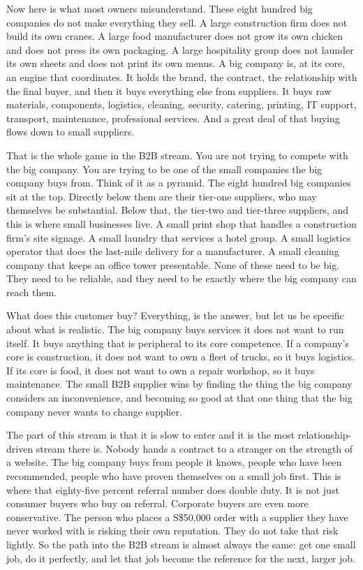 \documentclass[10pt,twoside,openany]{memoir}
\begin{document}
{{{{{{{{{{{{{{Now here is what most owners misunderstand. These eight hundred big
companies do not make everything they sell. A large construction firm
does not build its own cranes. A large food manufacturer does not grow
its own chicken and does not press its own packaging. A large
hospitality group does not launder its own sheets and does not print its
own menus. A big company is, at its core, an engine that coordinates. It
holds the brand, the contract, the relationship with the final buyer,
and then it buys everything else from suppliers. It buys raw materials,
components, logistics, cleaning, security, catering, printing, IT
support, transport, maintenance, professional services. And a great deal
of that buying flows down to small suppliers.

That is the whole game in the B2B stream. You are not trying to compete
with the big company. You are trying to be one of the small companies
the big company buys from. Think of it as a pyramid. The eight hundred
big companies sit at the top. Directly below them are their tier-one
suppliers, who may themselves be substantial. Below that, the tier-two
and tier-three suppliers, and this is where small businesses live. A
small print shop that handles a construction firm's site signage. A
small laundry that services a hotel group. A small logistics operator
that does the last-mile delivery for a manufacturer. A small cleaning
company that keeps an office tower presentable. None of these need to be
big. They need to be reliable, and they need to be exactly where the big
company can reach them.

What does this customer buy? Everything, is the answer, but let us be
specific about what is realistic. The big company buys services it does
not want to run itself. It buys anything that is peripheral to its core
competence. If a company's core is construction, it does not want to own
a fleet of trucks, so it buys logistics. If its core is food, it does
not want to own a repair workshop, so it buys maintenance. The small B2B
supplier wins by finding the thing the big company considers an
inconvenience, and becoming so good at that one thing that the big
company never wants to change supplier.

The part of this stream is that it is slow to enter and it is the most
relationship-driven stream there is. Nobody hands a contract to a
stranger on the strength of a website. The big company buys from people
it knows, people who have been recommended, people who have proven
themselves on a small job first. This is where that eighty-five percent
referral number does double duty. It is not just consumer buyers who buy
on referral. Corporate buyers are even more conservative. The person who
places a S\$50,000 order with a supplier they have never worked with is
risking their own reputation. They do not take that risk lightly. So the
path into the B2B stream is almost always the same: get one small job,
do it perfectly, and let that job become the reference for the next,
larger job.

}}}}}}}}}}}}}}
\end{document}
